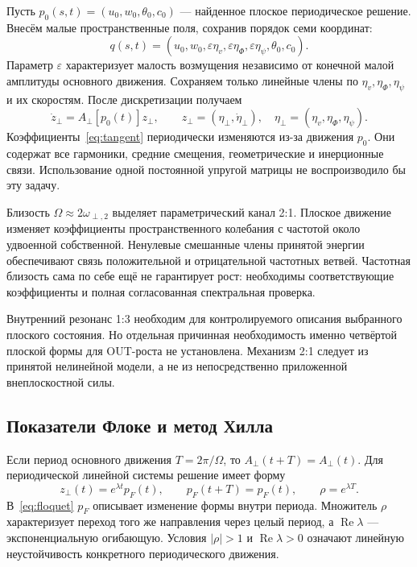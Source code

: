\documentclass[11pt,a4paper]{article}
\begin{document}
Пусть $p_0(s,t)=(u_0,w_0,\theta_0,c_0)$ --- найденное плоское периодическое решение. Внесём малые пространственные поля, сохранив порядок семи координат:
\[
q(s,t)=(u_0,w_0,\varepsilon\eta_v,
\varepsilon\eta_\Phi,\varepsilon\eta_\psi,\theta_0,c_0).
\]
Параметр $\varepsilon$ характеризует малость возмущения независимо от конечной малой амплитуды основного движения. Сохраняем только линейные члены по $\eta_v,\eta_\Phi,\eta_\psi$ и их скоростям. После дискретизации получаем
\begin{equation}
\dot z_\perp=A_\perp[p_0(t)]z_\perp,
\qquad z_\perp=(\eta_\perp,\dot\eta_\perp),\quad
\eta_\perp=(\eta_v,\eta_\Phi,\eta_\psi).
\label{eq:tangent}
\end{equation}
Коэффициенты~\eqref{eq:tangent} периодически изменяются из-за движения $p_0$. Они содержат все гармоники, средние смещения, геометрические и инерционные связи. Использование одной постоянной упругой матрицы не воспроизводило бы эту задачу.

Близость $\Omega\approx2\omega_{\perp,2}$ выделяет параметрический канал 2:1. Плоское движение изменяет коэффициенты пространственного колебания с частотой около удвоенной собственной. Ненулевые смешанные члены принятой энергии обеспечивают связь положительной и отрицательной частотных ветвей. Частотная близость сама по себе ещё не гарантирует рост: необходимы соответствующие коэффициенты и полная согласованная спектральная проверка.

Внутренний резонанс 1:3 необходим для контролируемого описания выбранного плоского состояния. Но отдельная причинная необходимость именно четвёртой плоской формы для OUT-роста не установлена. Механизм 2:1 следует из принятой нелинейной модели, а не из непосредственно приложенной внеплоскостной силы.

\subsection{Показатели Флоке и метод Хилла}
Если период основного движения $T=2\pi/\Omega$, то $A_\perp(t+T)=A_\perp(t)$. Для периодической линейной системы решение имеет форму
\begin{equation}
z_\perp(t)=e^{\lambda t}p_F(t),\qquad p_F(t+T)=p_F(t),
\qquad \rho=e^{\lambda T}.
\label{eq:floquet}
\end{equation}
В~\eqref{eq:floquet} $p_F$ описывает изменение формы внутри периода. Множитель $\rho$ характеризует переход того же направления через целый период, а $\operatorname{Re}\lambda$ --- экспоненциальную огибающую. Условия $|\rho|>1$ и $\operatorname{Re}\lambda>0$ означают линейную неустойчивость конкретного периодического движения.
\end{document}
